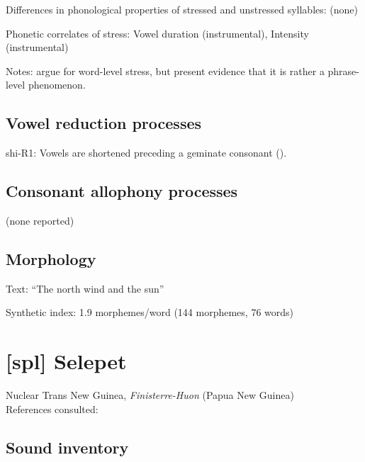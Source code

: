 {\begin{appendixdesc}
\item[Differences in phonological properties of stressed and unstressed syllables:] (none)

\item[Phonetic correlates of stress:] Vowel duration (instrumental), Intensity (instrumental)

\item[Notes:] \citet{GordonNafi2012} argue for word-level stress, but \citet{RoettgerEtAl2015} present evidence that it is rather a phrase-level phenomenon.
\end{appendixdesc}
\subsection*{Vowel reduction processes}
\begin{appendixdesc}

\item[shi-R1:] Vowels are shortened preceding a geminate consonant (\citealt{DellElmedlaoui2002}).
\end{appendixdesc}
\subsection*{Consonant allophony processes}

(none reported)

\subsection*{Morphology}
\begin{appendixdesc}
\item[Text:] “The north wind and the sun” \citep[219]{Ridouane2014}

\item[Synthetic index:] 1.9 morphemes/word (144 morphemes, 76 words)
\end{appendixdesc}

\section*{[spl] Selepet}  %
Nuclear Trans New Guinea, \textit{Finisterre-Huon} (Papua New Guinea)\medskip\\
References consulted: \citet{McElhanon1970}

\subsection*{Sound inventory}
\begin{appendixdesc}


\end{appendixdesc}}
